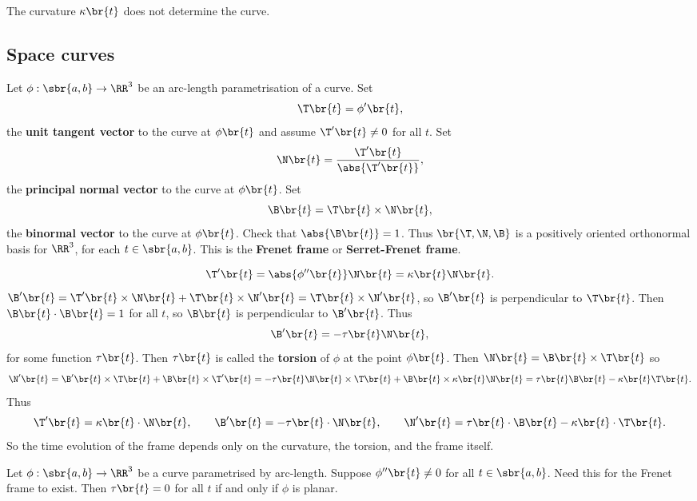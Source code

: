 The curvature $ \kappa\br{t} $ does not determine the curve.

\pagebreak

\subsection{Space curves}

Let $ \phi : \sbr{a, b} \to \RR^3 $ be an arc-length parametrisation of a curve. Set
$$ \T\br{t} = \phi'\br{t}, $$
the \textbf{unit tangent vector} to the curve at $ \phi\br{t} $ and assume $ \T'\br{t} \ne 0 $ for all $ t $. Set
$$ \N\br{t} = \dfrac{\T'\br{t}}{\abs{\T'\br{t}}}, $$
the \textbf{principal normal vector} to the curve at $ \phi\br{t} $. Set
$$ \B\br{t} = \T\br{t} \times \N\br{t}, $$
the \textbf{binormal vector} to the curve at $ \phi\br{t} $. Check that $ \abs{\B\br{t}} = 1 $. Thus $ \br{\T, \N, \B} $ is a positively oriented orthonormal basis for $ \RR^3 $, for each $ t \in \sbr{a, b} $. This is the \textbf{Frenet frame} or \textbf{Serret-Frenet frame}.


$$ \T'\br{t} = \abs{\phi''\br{t}}\N\br{t} = \kappa\br{t}\N\br{t}. $$
$ \B'\br{t} = \T'\br{t} \times \N\br{t} + \T\br{t} \times \N'\br{t} = \T\br{t} \times \N'\br{t} $, so $ \B'\br{t} $ is perpendicular to $ \T\br{t} $. Then $ \B\br{t} \cdot \B\br{t} = 1 $ for all $ t $, so $ \B\br{t} $ is perpendicular to $ \B'\br{t} $. Thus
$$ \B'\br{t} = -\tau\br{t}\N\br{t}, $$
for some function $ \tau\br{t} $. Then $ \tau\br{t} $ is called the \textbf{torsion} of $ \phi $ at the point $ \phi\br{t} $. Then $ \N\br{t} = \B\br{t} \times \T\br{t} $ so
$$ \N'\br{t} = \B'\br{t} \times \T\br{t} + \B\br{t} \times \T'\br{t} = -\tau\br{t}\N\br{t} \times \T\br{t} + \B\br{t} \times \kappa\br{t}\N\br{t} = \tau\br{t}\B\br{t} - \kappa\br{t}\T\br{t}. $$
Thus
$$ \T'\br{t} = \kappa\br{t} \cdot \N\br{t}, \qquad \B'\br{t} = -\tau\br{t} \cdot \N\br{t}, \qquad \N'\br{t} = \tau\br{t} \cdot \B\br{t} - \kappa\br{t} \cdot \T\br{t}. $$
So the time evolution of the frame depends only on the curvature, the torsion, and the frame itself.

\begin{proposition}
Let $ \phi : \sbr{a, b} \to \RR^3 $ be a curve parametrised by arc-length. Suppose $ \phi''\br{t} \ne 0 $ for all $ t \in \sbr{a, b} $. Need this for the Frenet frame to exist. Then $ \tau\br{t} = 0 $ for all $ t $ if and only if $ \phi $ is planar.
\end{proposition}

